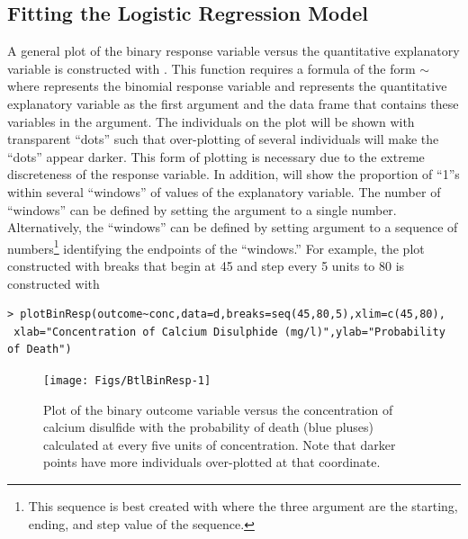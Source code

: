 \documentclass[10pt,openany]{book}\usepackage[]{graphicx}\usepackage[]{color}
\makeatletter
\newenvironment{kframe}{%
 \def\at@end@of@kframe{}%
 \ifinner\ifhmode%
  \def\at@end@of@kframe{\end{minipage}}%
  \begin{minipage}{\columnwidth}%
 \fi\fi%
 \def\FrameCommand##1{\hskip\@totalleftmargin \hskip-\fboxsep
 \colorbox{shadecolor}{##1}\hskip-\fboxsep
     \hskip-\linewidth \hskip-\@totalleftmargin \hskip\columnwidth}%
 \MakeFramed {\advance\hsize-\width
   \@totalleftmargin\z@ \linewidth\hsize
   \@setminipage}}%
 {\par\unskip\endMakeFramed%
 \at@end@of@kframe}
\newenvironment{knitrout}{}{} %
\makeatother
\begin{document}
\subsection{Fitting the Logistic Regression Model}
\vspace{-9pt}
A general plot of the binary response variable versus the quantitative explanatory variable is constructed with .  This function requires a formula of the form $\sim$ where  represents the binomial response variable and  represents the quantitative explanatory variable as the first argument and the data frame that contains these variables in the  argument.  The individuals on the  plot will be shown with transparent ``dots'' such that over-plotting of several individuals will make the ``dots'' appear darker.  This form of plotting is necessary due to the extreme discreteness of the response variable.  In addition,  will show the proportion of ``1''s within several ``windows'' of values of the explanatory variable.  The number of ``windows'' can be defined by setting the  argument to a single number.  Alternatively, the ``windows'' can be defined by setting  argument to a sequence of numbers\footnote{This sequence is best created with  where the three argument are the starting, ending, and step value of the sequence.} identifying the endpoints of the ``windows.''  For example, the plot constructed with breaks that begin at 45 and step every 5 units to 80  is constructed with

\begin{knitrout}
\color{fgcolor}\begin{kframe}
\begin{verbatim}
> plotBinResp(outcome~conc,data=d,breaks=seq(45,80,5),xlim=c(45,80),
 xlab="Concentration of Calcium Disulphide (mg/l)",ylab="Probability of Death")
\end{verbatim}
\end{kframe}\begin{figure}[hbtp]

{\centering \texttt{[image: Figs/BtlBinResp-1]} 

}

\caption[Plot of the binary outcome variable versus the concentration of calcium disulfide with the probability of death (blue pluses) calculated at every five units of concentration]{Plot of the binary outcome variable versus the concentration of calcium disulfide with the probability of death (blue pluses) calculated at every five units of concentration.  Note that darker points have more individuals over-plotted at that coordinate.}\label{fig:BtlBinResp}
\end{figure}


\end{knitrout}
\end{document}
